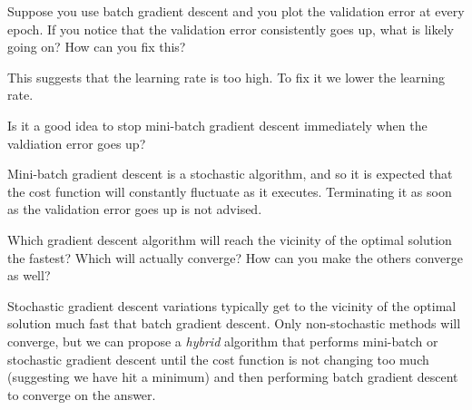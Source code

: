 \question Suppose you use batch gradient descent and you plot the validation error
at every epoch.
If you notice that the validation error consistently goes up,
what is likely going on?
How can you fix this?
\begin{solution}
    This suggests that the learning rate is too high. To fix it we lower the learning rate.
\end{solution}

\question Is it a good idea to stop mini-batch gradient descent immediately when the
valdiation error goes up?
\begin{solution}
    Mini-batch gradient descent is a stochastic algorithm, and so it is expected that the
    cost function will constantly fluctuate as it executes.
    Terminating it as soon as the validation error goes up is not advised.
\end{solution}

\question Which gradient descent algorithm will reach the vicinity of the optimal solution
the fastest? Which will actually converge? How can you make the others converge as well?
\begin{solution}
    Stochastic gradient descent variations typically get to the vicinity of the optimal solution
    much fast that batch gradient descent. 
    Only non-stochastic methods will converge,
    but we can propose a \emph{hybrid} algorithm that performs mini-batch or stochastic gradient
    descent until the cost function is not changing too much
    (suggesting we have hit a minimum)
    and then performing batch gradient descent to converge on the answer.
\end{solution}
